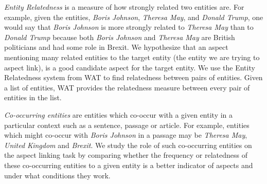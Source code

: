 \documentclass[sigconf,authordraft]{acmart}
\begin{document}
\textit{Entity Relatedness} is a measure of how strongly related two entities are. For example, given the entities, \textit{Boris Johnson}, \textit{Theresa May}, and \textit{Donald Trump}, one would say that \textit{Boris Johnson} is more strongly related to \textit{Theresa May} than to \textit{Donald Trump} because both \textit{Boris Johnson} and \textit{Theresa May} are British politicians and had some role in Brexit. We hypothesize that an aspect mentioning many related entities to the target entity (the entity we are trying to aspect link), is a good candidate aspect for the target entity. 
We use the Entity Relatedness system from WAT \cite{piccinno2014wat} to find relatedness between pairs of entities. Given a list of entities, WAT provides the relatedness measure between every pair of entities in the list. 

\textit{Co-occurring entities} are entities which co-occur with a given entity in a particular context such as a sentence, passage or article. For example, entities which might co-occur with \textit{Boris Johnson} in a passage may be \textit{Theresa May}, \textit{United Kingdom} and \textit{Brexit}. We study the role of such co-occurring entities on the aspect linking task by comparing whether the frequency or relatedness of these co-occurring entities to a given entity is a better indicator of aspects and under what conditions they work. 

\end{document}
